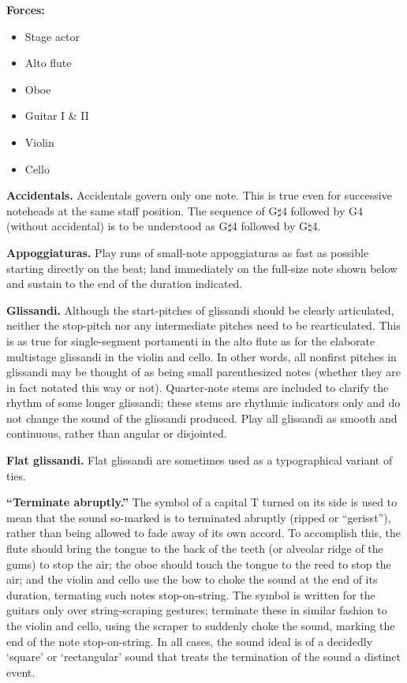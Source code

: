 \textbf{Forces:}

\begin{itemize} \itemsep2pt
\item Stage actor
\item Alto flute
\item Oboe
\item Guitar I \& II
\item Violin
\item Cello
\end{itemize}

\textbf{Accidentals.} Accidentals govern only one note. This is true even for
successive noteheads at the same staff position. The sequence of G$\sharp$4
followed by G4 (without accidental) is to be understood as G$\sharp$4 followed
by G$\natural$4.

\textbf{Appoggiaturas.} Play runs of small-note appoggiaturas as fast as
possible starting directly on the beat; land immediately on the full-size note
shown below and sustain to the end of the duration indicated.

\textbf{Glissandi.} Although the start-pitches of glissandi should be clearly
articulated, neither the stop-pitch nor any intermediate pitches need to be
rearticulated. This is as true for single-segment portamenti in the alto flute
as for the elaborate multistage glissandi in the violin and cello. In other
words, all nonfirst pitches in glissandi may be thought of as being small
parenthesized notes (whether they are in fact notated this way or not).
Quarter-note stems are included to clarify the rhythm of some longer glissandi;
these stems are rhythmic indicators only and do not change the sound of the
glissandi produced. Play all glissandi as smooth and continuous, rather than
angular or disjointed.

\textbf{Flat glissandi.} Flat glissandi are sometimes used as a typographical
variant of ties.

\textbf{``Terminate abruptly.''} The symbol of a capital T turned on its side
is used to mean that the sound so-marked is to terminated abruptly (ripped or
``gerisst''), rather than being allowed to fade away of its own accord. To
accomplish this, the flute should bring the tongue to the back of the teeth (or
alveolar ridge of the gums) to stop the air; the oboe should touch the tongue
to the reed to stop the air; and the violin and cello use the bow to choke the
sound at the end of its duration, termating such notes stop-on-string. The
symbol is written for the guitars only over string-scraping gestures; terminate
these in similar fashion to the violin and cello, using the scraper to suddenly
choke the sound, marking the end of the note stop-on-string. In all cases, the
sound ideal is of a decidedly `square' or `rectangular' sound that treats the
termination of the sound a distinct event.

